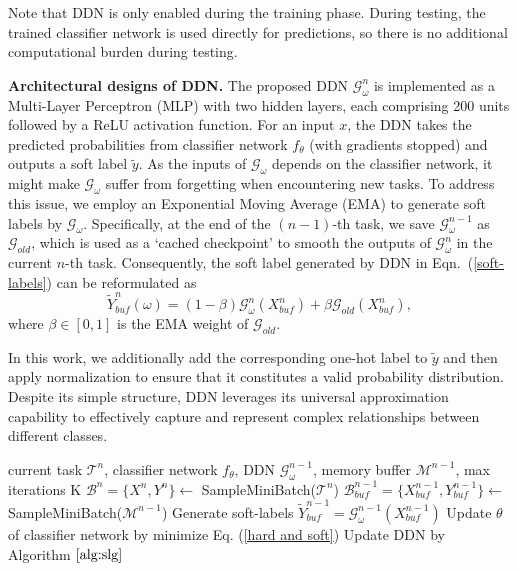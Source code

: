 \documentclass[table, xcdraw]{article}
\theoremstyle{plain}
\theoremstyle{definition}
\theoremstyle{remark}
\begin{document}
Note that DDN is only enabled during the training phase. During testing, the trained classifier network is used directly for predictions, so there is no additional computational burden during testing.

\textbf{Architectural designs of DDN.} The proposed DDN $\mathcal{G}_\omega^{n}$ is implemented as a Multi-Layer Perceptron (MLP) with two hidden layers, each comprising 200 units followed by a ReLU activation function. For an input $x$, the DDN takes the predicted probabilities from classifier network $f_\theta$ (with gradients stopped) and outputs a soft label $\tilde{y}$. As the inputs of $\mathcal{G}_\omega$ depends on the classifier network, it might make $\mathcal{G}_\omega$ suffer from forgetting when encountering new tasks. To address this issue, we employ an Exponential Moving Average (EMA) to generate soft labels by $\mathcal{G}_\omega$. Specifically, at the end of the $(n-1)$-th task, we save $\mathcal{G}_\omega^{n-1}$ as $\mathcal{G}_{old}$, which is used as a `cached checkpoint' to smooth the outputs of $\mathcal{G}_\omega^{n}$ in the current $n$-th task. Consequently, the soft label generated by DDN in Eqn.~(\ref{soft-labels}) can be reformulated as
\begin{equation}
    \tilde{Y}^{n}_{buf}(\omega) 
    = (1 - \beta) \mathcal{G}^{n}_\omega(X^{n}_{buf})
    + \beta \mathcal{G}_{old}(X^{n}_{buf}),
    \label{EMA soft labels}
\end{equation}
where $\beta \in [0,1]$ is the EMA weight of $\mathcal{G}_{old}$.

In this work, we additionally add the corresponding one-hot label to $\tilde{y}$ and then apply normalization to ensure that it constitutes a valid probability distribution.
Despite its simple structure, DDN leverages its universal approximation capability \cite{mlphaykin1998neural} to effectively capture and represent complex relationships between different classes.

\begin{algorithm}[t]
   \caption{Training of classifier network}
   \label{alg:whole process}
\begin{algorithmic}
    current task $\mathcal{T}^n$, classifier network $f_{\theta}$, DDN $\mathcal{G}_\omega^{n-1}$, memory buffer $\mathcal{M}^{n-1}$, max iterations K
   \STATE  $\mathcal{B}^{n}\!=\!\{X^n, Y^n\} \!\leftarrow\!$ SampleMiniBatch($\mathcal{T}^{n}$)
   \STATE $\mathcal{B}^{n-1}_{buf}\!=\!\{X^{n-1}_{buf}, Y^{n-1}_{buf}\} \!\leftarrow\!$ SampleMiniBatch($\mathcal{M}^{n-1}$)
   \STATE Generate soft-labels $\tilde{Y}_{buf}^{n-1}=\mathcal G_\omega^{n-1}(X_{buf}^{n-1})$
   \STATE Update $\theta$ of classifier network by minimize Eq. (\ref{hard and soft})
    \STATE Update DDN by Algorithm $\ref{alg:slg}$
   \ENDFOR
\end{algorithmic}
\end{algorithm}
\end{document}
